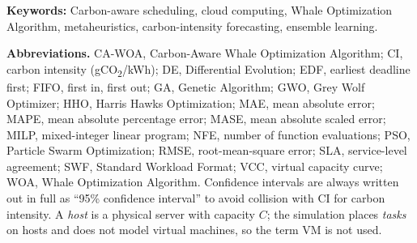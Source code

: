 \documentclass[12pt,a4paper]{article}
\providecommand{\DIFaddtex}[1]{{\protect\color{blue} \sf #1}} %
\providecommand{\DIFdeltex}[1]{{\protect\color{red} \scriptsize #1}} %
\providecommand{\DIFaddbegin}{} %
\providecommand{\DIFaddend}{} %
\providecommand{\DIFdelbegin}{} %
\providecommand{\DIFdelend}{} %
\providecommand{\DIFadd}[1]{\texorpdfstring{\DIFaddtex{#1}}{#1}} %
\providecommand{\DIFdel}[1]{\texorpdfstring{\DIFdeltex{#1}}{}} %
\providecommand{\DIFscaledelfig}{0.5}
\newlength{\DIFdelgraphicswidth} %
\newlength{\DIFdelgraphicsheight} %
\providecommand{\DIFaddincludegraphics}[2][]{{\color{blue}\fbox{\DIFOincludegraphics[#1]{#2}}}} %
\providecommand{\DIFdelincludegraphics}[2][]{%
\sbox{\DIFdelgraphicsbox}{\DIFOincludegraphics[#1]{#2}}%
\settoboxwidth{\DIFdelgraphicswidth}{\DIFdelgraphicsbox} %
\settoboxtotalheight{\DIFdelgraphicsheight}{\DIFdelgraphicsbox} %
\scalebox{\DIFscaledelfig}{%
\parbox[b]{\DIFdelgraphicswidth}{\usebox{\DIFdelgraphicsbox}\\[-\baselineskip] \rule{\DIFdelgraphicswidth}{0em}}\llap{\resizebox{\DIFdelgraphicswidth}{\DIFdelgraphicsheight}{%
\setlength{\unitlength}{\DIFdelgraphicswidth}%
\begin{picture}(1,1)%
\thicklines\linethickness{2pt} %
{\color[rgb]{1,0,0}\put(0,0){\framebox(1,1){}}}%
{\color[rgb]{1,0,0}\put(0,0){\line( 1,1){1}}}%
{\color[rgb]{1,0,0}\put(0,1){\line(1,-1){1}}}%
\end{picture}%
}\hspace*{3pt}}} %
} %
\DeclareRobustCommand{\DIFaddbegin}{\DIFOaddbegin \let\includegraphics\DIFaddincludegraphics} %
\DeclareRobustCommand{\DIFaddend}{\DIFOaddend \let\includegraphics\DIFOincludegraphics} %
\DeclareRobustCommand{\DIFdelbegin}{\DIFOdelbegin \let\includegraphics\DIFdelincludegraphics} %
\DeclareRobustCommand{\DIFdelend}{\DIFOaddend \let\includegraphics\DIFOincludegraphics} %
\begin{document}
\begin{abstract}
{States regions, with 30 independent seeds and task counts from 500 to 3000 on 10 }\DIFaddend and \DIFdelbegin \DIFdel{the ensemble forecaster reduces prediction error by roughly 12\% over a baseline LSTM. Unlike the aggressive baselines, whose deadline violations grow with load, CA-WOA scales safely, making it a
practical }\DIFdelend \DIFaddbegin \DIFadd{20 hosts, seeding
improves final solution quality in 59 of 60 algorithm-configuration cells across six optimisers, and is proved
never to be worse than the heuristic it seeds. The resulting scheduler produces fully feasible, deadline-safe
schedules and outperforms the virtual-capacity-curve policy of a deployed production }\DIFaddend carbon-aware \DIFdelbegin \DIFdel{scheduler}\DIFdelend \DIFaddbegin \DIFadd{scheduler in
all twelve configurations tested. A 12-hour-ahead ensemble forecast captures 73--89\% of the advantage that perfect
foresight holds over purely reactive scheduling, at an identical optimisation budget. We also report the boundary of the
approach: on a grid whose carbon intensity varies only 1.78$\times$ across the day, and under an enforced
minimum active-host constraint, the advantage of seeding disappears}\DIFaddend .
\end{abstract}
\noindent\textbf{Keywords:} Carbon-aware scheduling, cloud computing, Whale Optimization Algorithm, metaheuristics, carbon-intensity forecasting, ensemble learning.

\DIFaddbegin \vspace{4pt}
\noindent\DIFadd{\textbf{Abbreviations.}
CA-WOA, Carbon-Aware Whale Optimization Algorithm;
CI, carbon intensity (gCO\textsubscript{2}/kWh);
DE, Differential Evolution;
EDF, earliest deadline first;
FIFO, first in, first out;
GA, Genetic Algorithm;
GWO, Grey Wolf Optimizer;
HHO, Harris Hawks Optimization;
MAE, mean absolute error;
MAPE, mean absolute percentage error;
MASE, mean absolute scaled error;
MILP, mixed-integer linear program;
NFE, number of function evaluations;
PSO, Particle Swarm Optimization;
RMSE, root-mean-square error;
SLA, service-level agreement;
SWF, Standard Workload Format;
VCC, virtual capacity curve;
WOA, Whale Optimization Algorithm.
Confidence intervals are always written out in full as ``95\% confidence interval'' to avoid collision with
CI for carbon intensity. A \emph{host} is a physical server with capacity $C$; the simulation places
\emph{tasks} on hosts and does not model virtual machines, so the term VM is not used.
}
\end{document}
